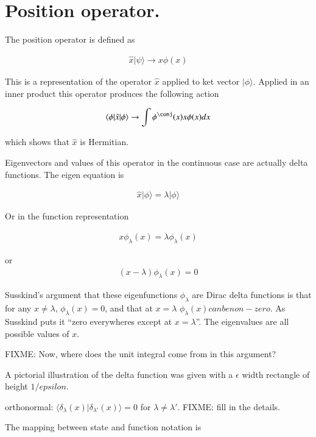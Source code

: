 \documentclass{article}
\newcommand{\ket}[1]{\lvert {#1} \rangle}
\newcommand{\bra}[1]{\langle {#1} \rvert}
\newcommand{\braket}[2]{\langle{#1} \vert {#2}\rangle}
\newcommand{\BraOpKet}[3]{\bra{#1} \hat{#2} \ket{#3} }
\newcommand{\hatx}[0]{\hat{x}}
\begin{document}
\section{ Position operator. }

The position operator is defined as

\begin{align*}
\hatx \ket{\psi} \rightarrow x \phi(x)
\end{align*}

This is a representation of the operator $\hatx$ applied to ket vector $\ket{\phi}$.  Applied in an inner product this operator produces the
following action

\begin{align*}
\BraOpKet{\phi}{x}{\phi} \rightarrow \int {\phi^\conj}(x) x \phi(x) dx
\end{align*}

which shows that $\hatx$ is Hermitian.

Eigenvectors and values of this operator in the continuous case are actually delta functions.  The eigen equation is

\begin{align*}
\hatx \ket{\phi} = \lambda \ket{\phi}
\end{align*}

Or in the function representation

\begin{align*}
x \phi_{\lambda}(x) = \lambda \phi_{\lambda}(x)
\end{align*}

or
\begin{align*}
(x - \lambda) \phi_{\lambda}(x) = 0
\end{align*}

Susskind's argument that these eigenfunctions $\phi_\lambda$ are Dirac delta functions is that for any $x\ne \lambda$, $\phi_\lambda(x) = 0$, and that at $x = \lambda$ $\phi_\lambda(x) can be non-zero$.  As Susskind puts it ``zero everywheres except at $x = \lambda$''.  The eigenvalues are all possible values of $x$.

FIXME: Now, where does the unit integral come from in this argument?

A pictorial illustration of the delta function was given with a $\epsilon$ width rectangle of height $1/epsilon$.

orthonormal: $\braket {\delta_{\lambda}(x)} {\delta_{\lambda'}(x)} = 0$ for $\lambda \ne \lambda'$.  FIXME: fill in the details.

The mapping between state and function notation is
\end{document}
